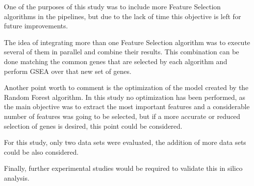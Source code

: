 \onehalfspacing


One of the purposes of this study was to include more Feature Selection algorithms in the pipelines, but due to the lack of time this objective is left for future improvements.

The idea of integrating more than one Feature Selection algorithm was to execute several of them in parallel and combine their results. This combination can be done matching the common genes that are selected by each algorithm and perform GSEA over that new set of genes.

Another point worth to comment is the optimization of the model created by the Random Forest algorithm. In this study no optimization has been performed, as the main objective was to extract the most important features and a considerable number of features was going to be selected, but if a more accurate or reduced selection of genes is desired, this point could be considered.

For this study, only two data sets were evaluated, the addition of more data sets could be also considered.

Finally, further experimental studies would be required to validate this in silico analysis.

